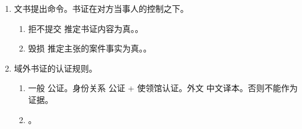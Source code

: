 \begin{enumerate}
\begin{enumerate}
\begin{enumerate}
\begin{enumerate}
                          \item 公文书证。直接推定为真实，有相反证据足以推翻的除外。
                          \item 私文书证。做题区分争议的是形式还是内容真实性。
                                \begin{itemize}
                                  \item 形式。签名、盖章、捺印等非伪造 \yjt {}承担证明责任。
                                        。
                                  \item 内容。。。\\
                                        \yi\, 。\\
                                        \er\, 。
                                \end{itemize}
                        \end{enumerate}
                  \item 文书提出命令。书证在对方当事人的控制之下。
                        \begin{enumerate}
                          \item 拒不提交 \yjt 推定书证内容为真。。
                          \item 毁损 \yjt 推定主张的案件事实为真。。
                        \end{enumerate}
                  \item 域外书证的认证规则。
                        \begin{enumerate}
                          \item \yi 一般 \yjt 公证。\er 身份关系 \yjt 公证 + 使领馆认证。\san 外文 \yjt 中文译本。否则不能作为证据。
                          \item {}。
                        \end{enumerate}
                \end{enumerate}

\end{enumerate}
\end{enumerate}
